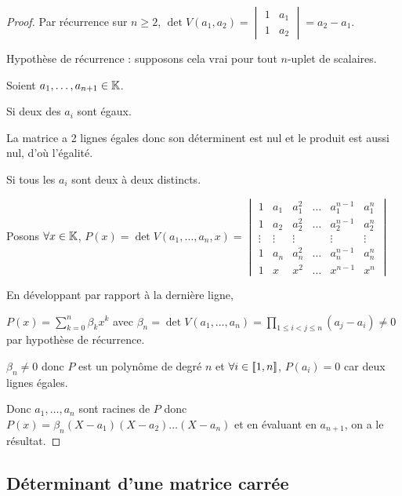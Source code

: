 
\begin{proof}
    Par récurrence sur $n \geqslant 2$, $\det V(a_1, a_2) = \begin{vmatrix}
        1 & a_1 \\
        1 & a_2
    \end{vmatrix} = a_2 - a_1$.

    Hypothèse de récurrence : supposons cela vrai pour tout $n$-uplet de scalaires. 

    Soient $a_1, \dots, a_{n+1} \in \mathbb{K}$.

     Si deux des $a_i$ sont égaux. 

    \svspace La matrice a 2 lignes égales donc son déterminent est nul et le produit est aussi nul, d'où l'égalité. 

     Si tous les $a_i$ sont deux à deux distincts.

    Posons $\forall x \in \mathbb{K}$, $P(x) = \det V(a_1, \dots, a_n, x) = \begin{vmatrix}
        1 & a_1 & a_1^2 & \dots & a_1^{n-1} & a_1^n \\
        1 & a_2 & a_2^2 & \dots & a_2^{n-1} & a_2^n \\
        \vdots & \vdots & \vdots & & \vdots & \vdots \\
        1 & a_n & a_n^2 & \dots & a_n^{n-1} & a_n^n \\
        1 & x & x^2 & \dots & x^{n-1} & x^n
    \end{vmatrix}$

    En développant par rapport à la dernière ligne, 
    
    $P(x) = \displaystyle \sum_{k=0}^n \beta_k x^k$ avec 
    $\beta_n = \det V(a_1, \dots, a_n) = \prod_{1 \leqslant i < j \leqslant n} (a_j - a_i) \neq 0$ par 
    hypothèse de récurrence.

    $\beta_n \neq 0$ donc $P$ est un polynôme de degré $n$ et $\forall i \in [\![1, n]\!]$, $P(a_i) = 0$ car deux lignes égales.

    Donc $a_1, \dots, a_n$ sont racines de $P$ donc
    $P(x) = \beta_n (X - a_1)(X - a_2) \dots (X - a_n)$ et 
    en évaluant en $a_{n+1}$, on a le résultat. 
\end{proof}

\subsection{Déterminant d'une matrice carrée}

